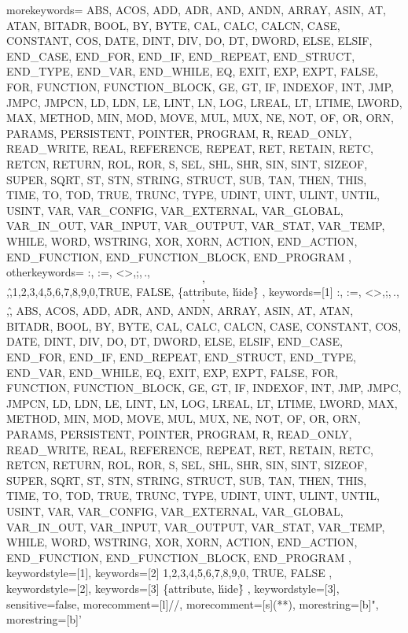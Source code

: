 
{
	morekeywords={
		ABS, ACOS, ADD, ADR, AND, ANDN, ARRAY, ASIN, AT, ATAN,
		BITADR, BOOL, BY, BYTE,
		CAL, CALC, CALCN, CASE, CONSTANT, COS,
		DATE, DINT, DIV, DO, DT, DWORD,
		ELSE, ELSIF, END_CASE, END_FOR, END_IF, END_REPEAT, END_STRUCT, END_TYPE, END_VAR, END_WHILE,
		EQ, EXIT, EXP, EXPT,
		FALSE, FOR, FUNCTION, FUNCTION_BLOCK,
		GE, GT,
		IF, INDEXOF, INT,
		JMP, JMPC, JMPCN,
		LD, LDN, LE, LINT, LN, LOG, LREAL, LT, LTIME, LWORD,
		MAX, METHOD, MIN, MOD, MOVE, MUL, MUX,
		NE, NOT,
		OF, OR, ORN,
		PARAMS, PERSISTENT, POINTER, PROGRAM,
		R, READ_ONLY, READ_WRITE, REAL, REFERENCE, REPEAT, RET, RETAIN, RETC, RETCN, RETURN, ROL, ROR,
		S, SEL, SHL, SHR, SIN, SINT, SIZEOF, SUPER, SQRT, ST, STN, STRING, STRUCT, SUB,
		TAN, THEN, THIS, TIME, TO, TOD, TRUE, TRUNC, TYPE,
		UDINT, UINT, ULINT, UNTIL, USINT,
		VAR, VAR_CONFIG, VAR_EXTERNAL, VAR_GLOBAL, VAR_IN_OUT, VAR_INPUT, VAR_OUTPUT, VAR_STAT, VAR_TEMP,
		WHILE, WORD, WSTRING,
		XOR, XORN,
		ACTION, END_ACTION, END_FUNCTION, END_FUNCTION_BLOCK, END_PROGRAM
	},
	otherkeywords={
		:, :=, <>,;,\,.,\[,\],\^,1,2,3,4,5,6,7,8,9,0,TRUE, FALSE, \{attribute,  \'hide\'\}
	},
	keywords=[1]{
		:, :=, <>,;,\,.,\[,\],\^,
		ABS, ACOS, ADD, ADR, AND, ANDN, ARRAY, ASIN, AT, ATAN,
		BITADR, BOOL, BY, BYTE,
		CAL, CALC, CALCN, CASE, CONSTANT, COS,
		DATE, DINT, DIV, DO, DT, DWORD,
		ELSE, ELSIF, END_CASE, END_FOR, END_IF, END_REPEAT, END_STRUCT, END_TYPE, END_VAR, END_WHILE,
		EQ, EXIT, EXP, EXPT,
		FALSE, FOR, FUNCTION, FUNCTION_BLOCK,
		GE, GT,
		IF, INDEXOF, INT,
		JMP, JMPC, JMPCN,
		LD, LDN, LE, LINT, LN, LOG, LREAL, LT, LTIME, LWORD,
		MAX, METHOD, MIN, MOD, MOVE, MUL, MUX,
		NE, NOT,
		OF, OR, ORN,
		PARAMS, PERSISTENT, POINTER, PROGRAM,
		R, READ_ONLY, READ_WRITE, REAL, REFERENCE, REPEAT, RET, RETAIN, RETC, RETCN, RETURN, ROL, ROR,
		S, SEL, SHL, SHR, SIN, SINT, SIZEOF, SUPER, SQRT, ST, STN, STRING, STRUCT, SUB,
		TAN, THEN, THIS, TIME, TO, TOD, TRUE, TRUNC, TYPE,
		UDINT, UINT, ULINT, UNTIL, USINT,
		VAR, VAR_CONFIG, VAR_EXTERNAL, VAR_GLOBAL, VAR_IN_OUT, VAR_INPUT, VAR_OUTPUT, VAR_STAT, VAR_TEMP,
		WHILE, WORD, WSTRING,
		XOR, XORN,
		ACTION, END_ACTION, END_FUNCTION, END_FUNCTION_BLOCK, END_PROGRAM
	},
	keywordstyle=[1]\color{blue},
	keywords=[2]{
		1,2,3,4,5,6,7,8,9,0, TRUE, FALSE
	},
	keywordstyle=[2]\color{codeyellow},
	keywords=[3]{
		\{attribute,  \'hide\'\}
	},
	keywordstyle=[3]\color{codegray},
	sensitive=false,
	morecomment=[l]{//}, 
	morecomment=[s]{(*}{*)},
	morestring=[b]{"},
	morestring=[b]{'}
}

